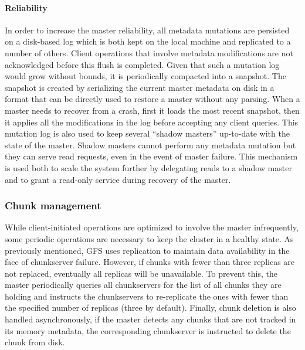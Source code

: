 \paragraph{Reliability} In order to increase the master reliability, all metadata mutations are persisted on a disk-based log which is both kept on the local machine and replicated to a number of others.
Client operations that involve metadata modifications are not acknowledged before this flush is completed.
Given that such a mutation log would grow without bounds, it is periodically compacted into a snapshot.
The snapshot is created by serializing the current master metadata on disk in a format that can be directly used to restore a master without any parsing.
When a master needs to recover from a crash, first it loads the most recent snapshot, then it applies all the modifications in the log before accepting any client queries.
This mutation log is also used to keep several ``shadow masters'' up-to-date with the state of the master.
Shadow masters cannot perform any metadata mutation but they can serve read requests, even in the event of master failure.
This mechanism is used both to scale the system further by delegating reads to a shadow master and to grant a read-only service during recovery of the master.

\subsubsection{Chunk management}
While client-initiated operations are optimized to involve the master infrequently, some periodic operations are necessary to keep the cluster in a healthy state.
As previously mentioned, GFS uses replication to maintain data availability in the face of chunkserver failure.
However, if chunks with fewer than three replicas are not replaced, eventually all replicas will be unavailable.
To prevent this, the master periodically queries all chunkservers for the list of all chunks they are holding and instructs the chunkservers to re-replicate the ones with fewer than the specified number of replicas (three by default).
Finally, chunk deletion is also handled asynchronously, if the master detects any chunks that are not tracked in its memory metadata, the corresponding chunkserver is instructed to delete the chunk from disk.